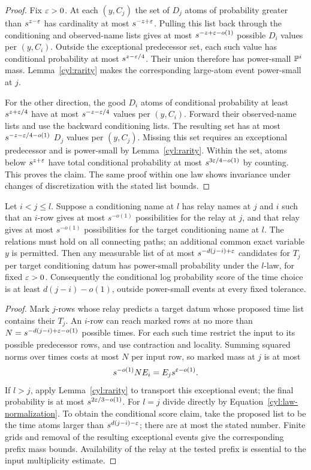 \begin{proof}
Fix $\varepsilon>0$.  At each $(y,C_j)$ the set of $D_j$ atoms of probability
greater than $s^{z-\varepsilon}$ has cardinality at most $s^{-z+\varepsilon}$.
Pulling this list back through the conditioning and observed-name lists
gives at most $s^{-z+\varepsilon-o(1)}$ possible $D_i$ values per $(y,C_i)$.
Outside the exceptional predecessor set, each such value has conditional
probability at most $s^{z-\varepsilon/4}$.  Their union therefore has
power-small $\mathbb P^i$ mass.  Lemma~\ref{cyl:rarity} makes the
corresponding large-atom event power-small at $j$.

For the other direction, the good $D_i$ atoms of conditional probability
at least $s^{z+\varepsilon/4}$ have at most $s^{-z-\varepsilon/4}$ values per
$(y,C_i)$.  Forward their observed-name lists and use the backward
conditioning lists.  The resulting set has at most
$s^{-z-\varepsilon/4-o(1)}$ $D_j$ values per $(y,C_j)$.  Missing this set
requires an exceptional predecessor and is power-small by
Lemma~\ref{cyl:rarity}.  Within the set, atoms below $s^{z+\varepsilon}$
have total conditional probability at most $s^{3\varepsilon/4-o(1)}$ by
counting.  This proves the claim.  The same proof within one law shows
invariance under changes of discretization with the stated list bounds.
\end{proof}

\begin{lemma}\label{cyl:time-prediction}
Let $i<j\le l$.  Suppose a conditioning name at $l$ has relay names
at $j$ and $i$ such that an $i$-row gives at most $s^{-o(1)}$ possibilities
for the relay at $j$, and that relay gives at most $s^{-o(1)}$
possibilities for the target conditioning name at $l$.  The relations
must hold on all connecting paths; an additional common exact variable
$y$ is permitted.  Then any measurable list of at most
$s^{-d(j-i)+\varepsilon}$ candidates for $T_j$ per target conditioning datum
has power-small probability under the $l$-law, for fixed $\varepsilon>0$.
Consequently the conditional log probability score of the time choice
is at least $d(j-i)-o(1)$, outside power-small events at every fixed
tolerance.
\end{lemma}

\begin{proof}
Mark $j$-rows whose relay predicts a target datum whose proposed time
list contains their $T_j$.  An $i$-row can reach marked rows at no more
than
$N=s^{-d(j-i)+\varepsilon-o(1)}$ possible times.  For each such time restrict
the input to its possible predecessor rows, and use contraction and
locality.  Summing squared norms over times costs at most $N$ per input
row, so marked mass at $j$ is at most
\[
 s^{-o(1)}NE_i=E_j s^{\varepsilon-o(1)}.
\]
If $l>j$, apply Lemma~\ref{cyl:rarity} to transport this exceptional
event; the final probability is at most $s^{2\varepsilon/3-o(1)}$.
For $l=j$ divide directly by Equation~\eqref{cyl:law-normalization}.
To obtain the conditional score claim, take the proposed list to be
the time atoms larger than $s^{d(j-i)-\varepsilon}$; there are at most the
stated number.  Finite grids and removal of the resulting exceptional
events give the corresponding prefix mass bounds.  Availability of the
relay at the tested prefix is essential to the input multiplicity
estimate.
\end{proof}


